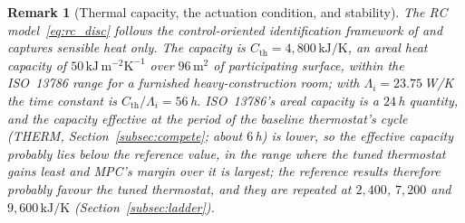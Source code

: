 \documentclass[pdflatex,sn-mathphys-num,iicol]{sn-jnl}
\theoremstyle{thmstyleone}\newtheorem{proposition}{Proposition}\newtheorem{corollary}{Corollary}
\theoremstyle{thmstyletwo}\newtheorem{remark}{Remark}\newtheorem{observation}{Observation}
\theoremstyle{thmstylethree}\newtheorem{definition}{Definition}
\newcommand{\Cth}{C_{\mathrm{th}}}
\begin{document}
\begin{remark}[Thermal capacity, the actuation condition, and stability]
\label{rem:rc}
The RC model~\eqref{eq:rc_disc} follows the control-oriented identification framework of \citet{Bacher2011} and captures sensible heat only. The capacity is $\Cth=4{,}800\,\text{kJ/K}$, an areal heat capacity of $50\,\text{kJ}\,\text{m}^{-2}\text{K}^{-1}$ over $96\,\text{m}^2$ of participating surface, within the ISO~13786 range for a furnished heavy-construction room; with $\Lambda_i=23.75\,$W/K the time constant is $\Cth/\Lambda_i=56\,$h. ISO~13786's areal capacity is a $24\,$h quantity, and the capacity effective at the period of the baseline thermostat's cycle (THERM, Section~\ref{subsec:compete}; about $6\,$h) is lower, so the effective capacity probably lies below the reference value, in the range where the tuned thermostat gains least and MPC's margin over it is largest; the reference results therefore probably favour the tuned thermostat, and they are repeated at $2{,}400$, $7{,}200$ and $9{,}600\,\text{kJ/K}$ (Section~\ref{subsec:ladder}).


\end{remark}
\end{document}
